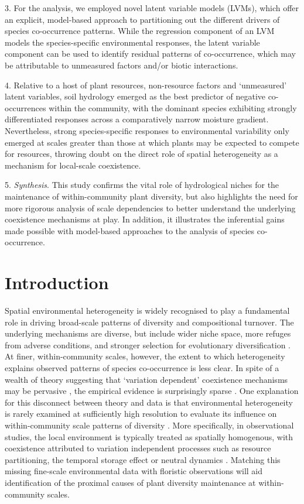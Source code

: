 3. For the analysis, we employed novel latent variable models (LVMs), which offer an explicit, model-based approach to partitioning out the different drivers of species co-occurrence patterns. While the regression component of an LVM models the species-specific environmental responses, the latent variable component can be used to identify residual patterns of co-occurrence, which may be attributable to unmeasured factors and/or biotic interactions.     

4. Relative to a host of plant resources, non-resource factors and `unmeasured' latent variables, soil hydrology emerged as the best predictor of negative co-occurrences within the community, with the dominant species exhibiting strongly differentiated responses across a comparatively narrow moisture gradient. Nevertheless, strong species-specific responses to environmental variability only emerged at scales greater than those at which plants may be expected to compete for resources, throwing doubt on the direct role of spatial heterogeneity as a mechanism for local-scale coexistence. 

5. \textit{Synthesis}. This study confirms the vital role of hydrological niches for the maintenance of within-community plant diversity, but also highlights the need for more rigorous analysis of scale dependencies to better understand the underlying coexistence mechanisms at play. In addition, it illustrates the inferential gains made possible with model-based approaches to the analysis of species co-occurrence.

\newpage

\section{Introduction}

Spatial environmental heterogeneity is widely recognised to play a fundamental role in driving broad-scale patterns of diversity and compositional turnover. The underlying mechanisms are diverse, but include wider niche space, more refuges from adverse conditions, and stronger selection for evolutionary diversification \citep[reviewed in][]{Stein2014}. At finer, within-community scales, however, the extent to which heterogeneity explains observed patterns of species co-occurrence is less clear. In spite of a wealth of theory suggesting that `variation dependent' coexistence mechanisms may be pervasive \citep{Chesson2000, Amarasekare2003, Snyder2004}, the empirical evidence is surprisingly sparse \citep[but see][]{Sears2007, Fridley2011}. One explanation for this disconnect between theory and data is that environmental heterogeneity is rarely examined at sufficiently high resolution to evaluate its influence on within-community scale patterns of diversity \citep{Adler2013, Kraft2014}. More specifically, in observational studies, the local environment is typically treated as spatially homogenous, with coexistence attributed to variation independent processes such as resource partitioning, the temporal storage effect or neutral dynamics \citep{Chesson2000, Hubbell2001}. Matching this missing fine-scale environmental data with floristic observations will aid identification of the proximal causes of plant diversity maintenance at within-community scales.

